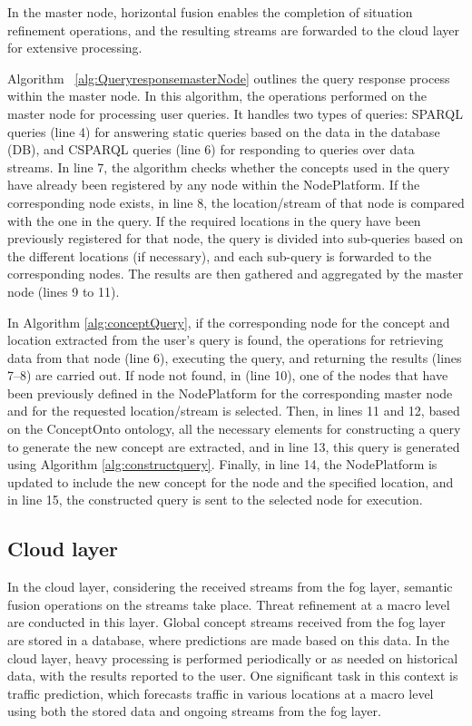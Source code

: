 \documentclass[5p,times]{elsarticle}
\begin{document}
In the master node, horizontal fusion enables the completion
of situation refinement operations, and the resulting streams are forwarded to the cloud layer
 for extensive processing. 


Algorithm ~\ref{alg:QueryresponsemasterNode} outlines the query response process within the master node.
In this algorithm, the operations performed on the master node for processing user
 queries. It handles two types of queries: SPARQL queries (line 4) for answering static queries based on
  the data in the database (DB), and CSPARQL queries (line 6) for responding to queries over data streams.
  In line 7, the algorithm checks whether the concepts used in the query have already been 
  registered by any node within the NodePlatform. 
  If the corresponding node exists, in line 8, the location/stream of that node is compared with the one 
  in the query. If the required locations in the query have been previously registered for that node, 
  the query is divided into sub-queries based on the different locations (if necessary), 
  and each sub-query is forwarded to the corresponding nodes. The results are then gathered and 
  aggregated by the master node (lines 9 to 11).



In Algorithm \ref{alg:conceptQuery}, if the corresponding node for the concept and location extracted
 from the user's query is found, the operations for retrieving data from that node (line 6),
  executing the query, and returning the results (lines 7–8) are carried out. If node not found,
   in (line 10), one of the nodes that have been previously defined in the NodePlatform for the corresponding
   master node and for the requested
    location/stream is selected.
Then, in lines 11 and 12, based on the ConceptOnto ontology, all the necessary elements for
 constructing a query to generate the new concept are extracted, and in line 13,
  this query is generated using Algorithm \ref{alg:constructquery}.
Finally, in line 14, the NodePlatform is updated to include the new concept
 for the node and the specified location, and in line 15, the constructed query is sent
  to the selected node for execution.

  








\subsection{Cloud layer}
In the cloud layer, considering the received streams from the fog layer, semantic fusion operations on the streams take place. Threat refinement at a macro level are conducted in this layer. 
Global concept streams received from the fog layer are stored in a database, where predictions are made based on this data. In the cloud layer, heavy processing is performed periodically or as needed on historical data, with the results reported to the user. One significant task in this context is traffic prediction, 
which forecasts traffic in various locations at a macro level using both the stored data and ongoing streams from the fog layer.
\end{document}
